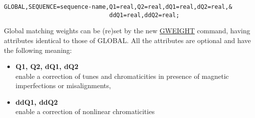 \begin{verbatim}
GLOBAL,SEQUENCE=sequence-name,Q1=real,Q2=real,dQ1=real,dQ2=real,&
                              ddQ1=real,ddQ2=real;
\end{verbatim}

Global matching weights can be (re)set by the new 
\href{gweight}{GWEIGHT} command, having attributes identical to those of
GLOBAL. 
All the attributes are optional and have the following meaning:
\begin{itemize}
  \item {\bf Q1, Q2, dQ1, dQ2} \\
    enable a correction of tunes and chromaticities in presence of
    magnetic imperfections or misalignments, 
  \item {\bf ddQ1, ddQ2} \\
    enable a correction of nonlinear chromaticities
\end{itemize}
